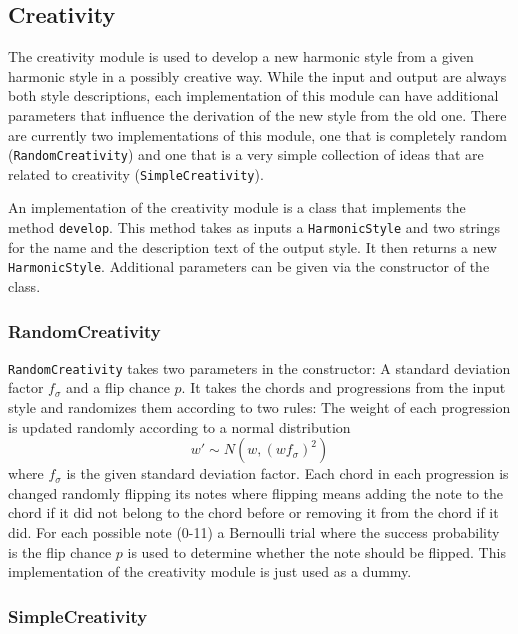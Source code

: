 \subsection{Creativity}

The creativity module is used to develop a new harmonic style from a given harmonic style in a possibly creative way.
While the input and output are always both style descriptions, each implementation of this module can have additional parameters that influence the derivation of the new style from the old one.
There are currently two implementations of this module, one that is completely random (\texttt{RandomCreativity}) and one that is a very simple collection of ideas that are related to creativity (\texttt{SimpleCreativity}).

An implementation of the creativity module is a class that implements the method \texttt{develop}.
This method takes as inputs a \texttt{HarmonicStyle} and two strings for the name and the description text of the output style.
It then returns a new \texttt{HarmonicStyle}.
Additional parameters can be given via the constructor of the class.

\subsubsection{RandomCreativity}

\texttt{RandomCreativity} takes two parameters in the constructor:
A standard deviation factor $f_\sigma$ and a flip chance $p$.
It takes the chords and progressions from the input style and randomizes them according to two rules:
The weight of each progression is updated randomly according to a normal distribution
\[ w' \sim N(w, (w f_\sigma)^2)\]
where $f_\sigma$ is the given standard deviation factor.
Each chord in each progression is changed randomly flipping its notes where flipping means adding the note to the chord if it did not belong to the chord before or removing it from the chord if it did.
For each possible note (0-11) a Bernoulli trial where the success probability is the flip chance $p$ is used to determine whether the note should be flipped.
This implementation of the creativity module is just used as a dummy.

\subsubsection{SimpleCreativity}

